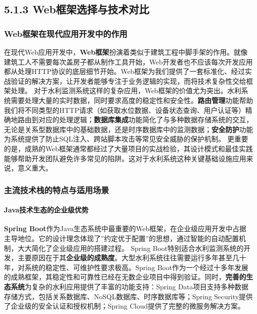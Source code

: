 \subsection{5.1.3 Web框架选择与技术对比}\label{webux6846ux67b6ux9009ux62e9ux4e0eux6280ux672fux5bf9ux6bd4}
\subsubsection{Web框架在现代应用开发中的作用}\label{webux6846ux67b6ux5728ux73b0ux4ee3ux5e94ux7528ux5f00ux53d1ux4e2dux7684ux4f5cux7528}
在现代Web应用开发中，\textbf{Web框架}扮演着类似于建筑工程中脚手架的作用。就像建筑工人不需要每次盖房子都从制作工具开始，Web开发者也不应该每次开发应用都从处理HTTP协议的底层细节开始。Web框架为我们提供了一套标准化、经过实战验证的解决方案，让开发者能够专注于业务逻辑的实现，而将技术复杂性交给框架处理。
对于水利监测系统这样的复杂应用，Web框架的价值尤为突出。水利系统需要处理大量的实时数据，同时要求高度的稳定性和安全性。\textbf{路由管理}功能帮助我们将不同类型的HTTP请求（如获取水位数据、设备状态查询、用户认证等）精确地路由到对应的处理逻辑；\textbf{数据库集成}功能简化了与多种数据存储系统的交互，无论是关系型数据库中的基础数据，还是时序数据库中的监测数据；\textbf{安全防护}功能为系统提供了防止SQL注入、跨站脚本攻击等常见安全威胁的保护机制。
更重要的是，成熟的Web框架通常都经过了大量项目的实战检验，其设计模式和最佳实践能够帮助开发团队避免许多常见的陷阱。这对于水利系统这种关键基础设施应用来说，意义重大。
\subsubsection{主流技术栈的特点与适用场景}\label{ux4e3bux6d41ux6280ux672fux6808ux7684ux7279ux70b9ux4e0eux9002ux7528ux573aux666f}
\paragraph{Java技术生态的企业级优势}\label{javaux6280ux672fux751fux6001ux7684ux4f01ux4e1aux7ea7ux4f18ux52bf} \textbf{Spring
Boot}作为Java生态系统中最重要的Web框架，在企业级应用开发中占据主导地位。它的设计理念体现了''约定优于配置''的思想，通过智能的自动配置机制，大大简化了企业级应用的搭建过程。 Spring
Boot特别适合水利监测系统的开发，主要原因在于其\textbf{企业级的成熟度}。大型水利系统往往需要运行多年甚至几十年，对系统的稳定性、可维护性要求极高。Spring
Boot作为一个经过十多年发展的成熟框架，其稳定性和可靠性已经在无数企业项目中得到验证。同时，\textbf{完善的生态系统}为复杂的水利应用提供了丰富的功能支持：Spring
Data项目支持多种数据存储方式，包括关系数据库、NoSQL数据库、时序数据库等；Spring Security提供了企业级的安全认证和授权机制；Spring Cloud提供了完整的微服务解决方案。
\begin{lstlisting}[language=Java] \end{lstlisting}
